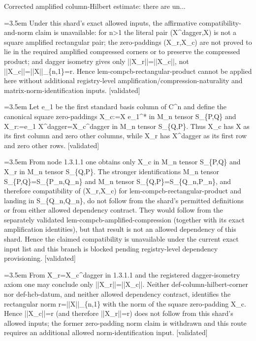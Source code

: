 \documentclass{article}
\newcommand{\step}[1]{\par\noindent\hangindent=3.5em\hangafter=1%
  \makebox[3.5em][l]{\textbf{#1.}}}
\newcommand{\steptag}[1]{\hfill{\small\textsf{[#1]}}}
\begin{document}
\begin{proofbox}{Corrected amplified column-Hilbert estimate: there are un...}
\step{1.3.1} Under this shard's exact allowed inputs, the affirmative compatibility-and-norm claim is unavailable: for n>1 the literal pair (X\textasciicircum{}dagger,X) is not a square amplified rectangular pair; the zero-paddings (X\_r,X\_c) are not proved to lie in the required amplified compressed corners or to preserve the compressed product; and dagger isometry gives only ||X\_r||=||X\_c||, not ||X\_c||=||X||\_\{n,1\}=r. Hence lem-compcb-rectangular-product cannot be applied here without additional registry-level amplification/compression-naturality and matrix-norm-identification inputs. \steptag{validated} \\[6pt]
\step{1.3.1.1} Let e\_1 be the first standard basis column of C\textasciicircum{}n and define the canonical square zero-paddings X\_c:=X e\_1\textasciicircum{}* in M\_n tensor S\_\{P,Q\} and X\_r:=e\_1 X\textasciicircum{}dagger=X\_c\textasciicircum{}dagger in M\_n tensor S\_\{Q,P\}. Thus X\_c has X as its first column and zero other columns, while X\_r has X\textasciicircum{}dagger as its first row and zero other rows. \steptag{validated} \\[4pt]
\step{1.3.1.2} From node 1.3.1.1 one obtains only X\_c in M\_n tensor S\_\{P,Q\} and X\_r in M\_n tensor S\_\{Q,P\}. The stronger identifications M\_n tensor S\_\{P,Q\}=S\_\{P\_n,Q\_n\} and M\_n tensor S\_\{Q,P\}=S\_\{Q\_n,P\_n\}, and therefore compatibility of (X\_r,X\_c) for lem-compcb-rectangular-product and landing in S\_\{Q\_n,Q\_n\}, do not follow from the shard's permitted definitions or from either allowed dependency contract. They would follow from the separately validated lem-compcb-amplified-compression (together with its exact amplification identities), but that result is not an allowed dependency of this shard. Hence the claimed compatibility is unavailable under the current exact input list and this branch is blocked pending registry-level dependency provisioning. \steptag{validated} \\[4pt]
\step{1.3.1.3} From X\_r=X\_c\textasciicircum{}dagger in 1.3.1.1 and the registered dagger-isometry axiom one may conclude only ||X\_r||=||X\_c||. Neither def-column-hilbert-corner nor def-hcb-datum, and neither allowed dependency contract, identifies the rectangular norm r=||X||\_\{n,1\} with the norm of the square zero-padding X\_c. Hence ||X\_c||=r (and therefore ||X\_r||=r) does not follow from this shard's allowed inputs; the former zero-padding norm claim is withdrawn and this route requires an additional allowed norm-identification input. \steptag{validated} \\[6pt]

\end{proofbox}
\end{document}
